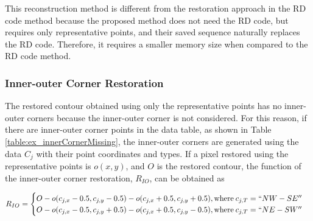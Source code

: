 
This reconstruction method is different from the restoration approach in the RD code method because the proposed method does not need the RD code, but requires only representative points, and their saved sequence naturally replaces the RD code. Therefore, it requires a smaller memory size when compared to the RD code method.

\subsubsection{Inner-outer Corner Restoration}




The restored contour obtained using only the representative points has no inner-outer corners because the inner-outer corner is not considered. For this reason, if there are inner-outer corner points in the data table, as shown in Table \ref{table:ex_innerCornerMissing}, the inner-outer corners are generated using the data $C_j$ with their point coordinates and types. If a pixel restored using the representative points is $o(x, y)$, and $O$ is the restored contour, the function of the inner-outer corner restoration, $R_{IO}$, can be obtained as

\begin{equation}
R_{IO} = \begin{cases}
O - o(c_{j,x} - 0.5, c_{j,y} - 0.5) - o(c_{j,x} + 0.5, c_{j,y} + 0.5), \text{where\:} c_{j,T} = ``NW-SE'' \\
O - o(c_{j,x} - 0.5, c_{j,y} + 0.5) - o(c_{j,x} + 0.5, c_{j,y} - 0.5), \text{where\:} c_{j,T} = ``NE-SW'' \\
\end{cases}
\label{eq:r_io}
\end{equation}
